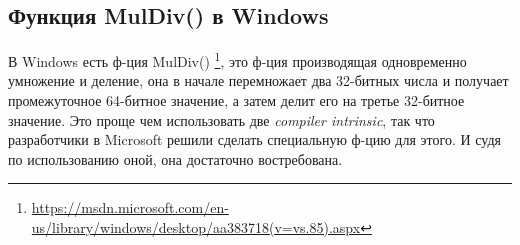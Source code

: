 \subsection{Функция MulDiv() в Windows}

В Windows есть ф-ция MulDiv()
\footnote{\url{https://msdn.microsoft.com/en-us/library/windows/desktop/aa383718(v=vs.85).aspx}},
это ф-ция производящая одновременно умножение и деление, она в начале перемножает два 32-битных числа и получает
промежуточное 64-битное значение, а затем делит его на третье 32-битное значение.
Это проще чем использовать две \emph{compiler intrinsic}, так что разработчики в Microsoft решили сделать специальную ф-цию
для этого.
И судя по использованию оной, она достаточно востребована.

